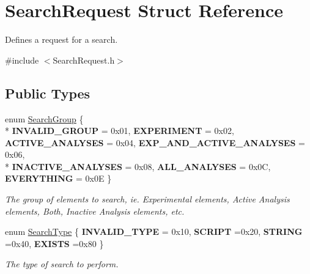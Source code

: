\hypertarget{struct_search_request}{\section{Search\-Request Struct Reference}
\label{struct_search_request}
}


Defines a request for a search.  




{\ttfamily \#include $<$Search\-Request.\-h$>$}

\subsection*{Public Types}
\begin{DoxyCompactItemize}
\item 
enum \hyperlink{struct_search_request_a9cbf0fa4db86fccb45d34cc7d254dd53}{Search\-Group} \{ \\*
{\bfseries I\-N\-V\-A\-L\-I\-D\-\_\-\-G\-R\-O\-U\-P} = 0x01, 
{\bfseries E\-X\-P\-E\-R\-I\-M\-E\-N\-T} = 0x02, 
{\bfseries A\-C\-T\-I\-V\-E\-\_\-\-A\-N\-A\-L\-Y\-S\-E\-S} = 0x04, 
{\bfseries E\-X\-P\-\_\-\-A\-N\-D\-\_\-\-A\-C\-T\-I\-V\-E\-\_\-\-A\-N\-A\-L\-Y\-S\-E\-S} = 0x06, 
\\*
{\bfseries I\-N\-A\-C\-T\-I\-V\-E\-\_\-\-A\-N\-A\-L\-Y\-S\-E\-S} = 0x08, 
{\bfseries A\-L\-L\-\_\-\-A\-N\-A\-L\-Y\-S\-E\-S} = 0x0\-C, 
{\bfseries E\-V\-E\-R\-Y\-T\-H\-I\-N\-G} = 0x0\-E
 \}
\begin{DoxyCompactList}\small\item\em The group of elements to search, ie. Experimental elements, Active Analysis elements, Both, Inactive Analysis elements, etc. \end{DoxyCompactList}\item 
enum \hyperlink{struct_search_request_a715ada4359cbb4eacc24e02015445dc7}{Search\-Type} \{ {\bfseries I\-N\-V\-A\-L\-I\-D\-\_\-\-T\-Y\-P\-E} = 0x10, 
{\bfseries S\-C\-R\-I\-P\-T} =0x20, 
{\bfseries S\-T\-R\-I\-N\-G} =0x40, 
{\bfseries E\-X\-I\-S\-T\-S} =0x80
 \}
\begin{DoxyCompactList}\small\item\em The type of search to perform. \end{DoxyCompactList}\end{DoxyCompactItemize}
